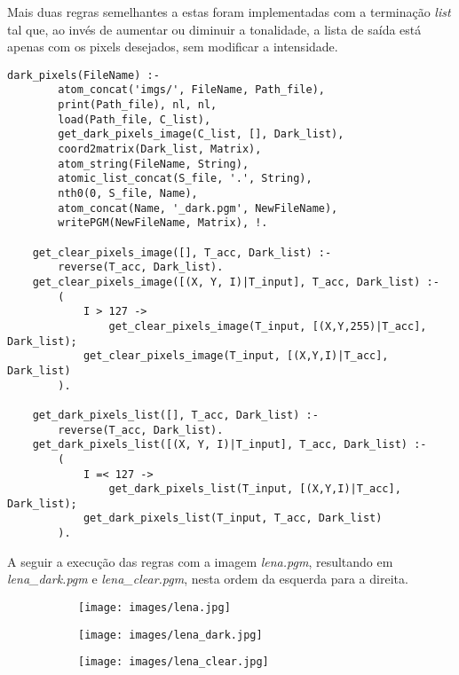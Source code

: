 \documentclass{article}
\begin{document}
        Mais duas regras semelhantes a estas foram implementadas com a
        terminação \textit{list} tal que, ao invés de aumentar ou diminuir a
        tonalidade, a lista de saída está apenas com os pixels desejados, sem
        modificar a intensidade.
        \begin{lstlisting}[frame=single]
    dark_pixels(FileName) :-
        atom_concat('imgs/', FileName, Path_file),
        print(Path_file), nl, nl,
        load(Path_file, C_list),
        get_dark_pixels_image(C_list, [], Dark_list),
        coord2matrix(Dark_list, Matrix),
        atom_string(FileName, String),
        atomic_list_concat(S_file, '.', String),
        nth0(0, S_file, Name),
        atom_concat(Name, '_dark.pgm', NewFileName),
        writePGM(NewFileName, Matrix), !.
    
    get_clear_pixels_image([], T_acc, Dark_list) :-
        reverse(T_acc, Dark_list).
    get_clear_pixels_image([(X, Y, I)|T_input], T_acc, Dark_list) :-
        (
            I > 127 ->
                get_clear_pixels_image(T_input, [(X,Y,255)|T_acc], Dark_list);
            get_clear_pixels_image(T_input, [(X,Y,I)|T_acc], Dark_list)
        ).
        
    get_dark_pixels_list([], T_acc, Dark_list) :-
        reverse(T_acc, Dark_list).
    get_dark_pixels_list([(X, Y, I)|T_input], T_acc, Dark_list) :-
        (
            I =< 127 ->
                get_dark_pixels_list(T_input, [(X,Y,I)|T_acc], Dark_list);
            get_dark_pixels_list(T_input, T_acc, Dark_list)
        ).
        \end{lstlisting}

        A seguir a execução das regras com a imagem \textit{lena.pgm},
        resultando em \textit{lena\_dark.pgm} e \textit{lena\_clear.pgm}, nesta
        ordem da esquerda para a direita.
        \begin{figure}[h]
        \centering
            \begin{subfigure}
            \centering
            \texttt{[image: images/lena.jpg]}
            \end{subfigure}
            \begin{subfigure}
            \centering
            \texttt{[image: images/lena\_dark.jpg]}
            \end{subfigure}
            \begin{subfigure}
            \centering
            \texttt{[image: images/lena\_clear.jpg]}
            \end{subfigure}
        \end{figure}
\end{document}
